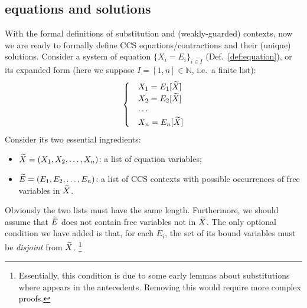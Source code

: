 \subsection{\Multivariate equations and solutions}

With the formal definitions of \multivariate substitution and
\multivariate (weakly-guarded) contexts, now we are ready to formally
define \multivariate CCS equations/contractions and their (unique)
solutions. Consider a system of equation $\{X_i = E_i\}_{i\in I}$
(Def.~\ref{def:equation}), or its expanded form (here we suppose $I = [1,n]
\in \mathbb{N}$, i.e.~a finite list):
\begin{equation*}
  \begin{cases}
    &X_1 = E_1[\widetilde X] \\
    &X_2 = E_2[\widetilde X] \\
    & \cdots \\
    &X_n = E_n[\widetilde X]
  \end{cases}
\end{equation*}
Consider its two essential ingredients:
\begin{itemize}
\item $\widetilde X = (X_1, X_2, \ldots, X_n)$: a list of equation variables;
\item $\widetilde E = (E_1, E_2, \ldots, E_n)$: a list of CCS contexts 
  with possible occurrences of free variables in $\widetilde X$.
\end{itemize}
Obviously the two lists must have the same length. 
Furthermore, we should assume that $\widetilde E$ does not contain
 free variables not in $\widetilde X$.
The only optional condition we have added is that, for each
$E_i$, the set of its bound variables must be \emph{disjoint} from $\widetilde X$.
\footnote{Essentially, this condition is due
  to  some early lemmas about \multivariate
  substitutions where 
 appears in the antecedents. Removing this would require 
  more complex proofs.
} 
